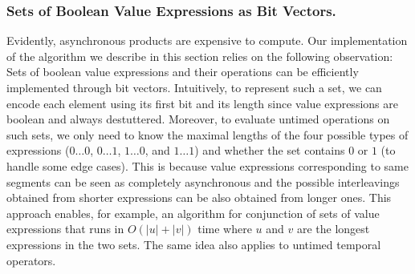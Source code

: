 






\subsubsection{Sets of Boolean Value Expressions as Bit Vectors.}
Evidently, asynchronous products are expensive to compute.
Our implementation of the algorithm we describe in this section relies on the following observation:
Sets of boolean value expressions and their operations can be efficiently implemented through bit vectors.
Intuitively, to represent such a set, we can encode each element using its first bit and its length since value expressions are boolean and always destuttered.
Moreover, to evaluate untimed operations on such sets, we only need to know the maximal lengths of the four possible types of expressions ($0 \ldots 0$, $0 \ldots 1$, $1 \ldots 0$, and $1 \ldots 1$) and whether the set contains $0$ or $1$ (to handle some edge cases).
This is because value expressions corresponding to same segments can be seen as completely asynchronous and the possible interleavings obtained from shorter expressions can be also obtained from longer ones.
This approach enables, for example, an algorithm for conjunction of sets of value expressions that runs in $O(|u| + |v|)$ time where $u$ and $v$ are the longest expressions in the two sets.
The same idea also applies to untimed temporal operators.

